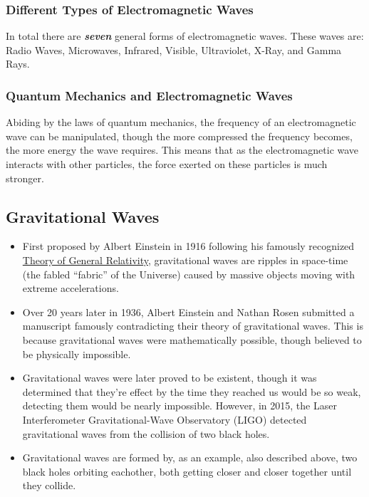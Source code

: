 \documentclass{article}
\begin{document}
\subsubsection{Different Types of Electromagnetic Waves}
In total there are \textbf{\textit{seven}} general forms of electromagnetic waves. These waves are: Radio Waves, Microwaves, Infrared, Visible, Ultraviolet, X-Ray, and Gamma Rays.

\subsubsection{Quantum Mechanics and Electromagnetic Waves}
Abiding by the laws of quantum mechanics, the frequency of an electromagnetic wave can be manipulated, though the more compressed the frequency becomes, the more energy the wave requires. This means that as the electromagnetic wave interacts with other particles, the force exerted on these particles is much stronger.

\subsection{Gravitational Waves}
\begin{itemize}
    \item First proposed by Albert Einstein in 1916 following his famously recognized \hyperref[sec:generalrelativity]{Theory of General Relativity}, gravitational waves are ripples in space-time (the fabled “fabric” of the Universe) caused by massive objects moving with extreme accelerations.
    \item Over 20 years later in 1936, Albert Einstein and Nathan Rosen submitted a manuscript famously contradicting their theory of gravitational waves. This is because gravitational waves were mathematically possible, though believed to be physically impossible.
    \item Gravitational waves were later proved to be existent, though it was determined that they're effect by the time they reached us would be so weak, detecting them would be nearly impossible. However, in 2015, the Laser Interferometer Gravitational-Wave Observatory (LIGO) detected gravitational waves from the collision of two black holes.
    \item Gravitational waves are formed by, as an example, also described above, two black holes orbiting eachother, both getting closer and closer together until they collide.
\end{itemize}
\end{document}
